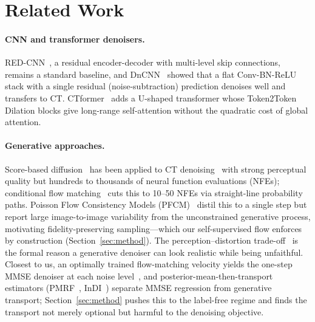 \documentclass[letterpaper]{article} %
\begin{document}
\section{Related Work}

\paragraph{CNN and transformer denoisers.}
RED-CNN~\cite{chen2017lowdose}, a residual encoder-decoder with multi-level skip
connections, remains a standard baseline, and DnCNN~\cite{zhang2017beyond} showed
that a flat Conv-BN-ReLU stack with a single residual (noise-subtraction)
prediction denoises well and transfers to CT.  CTformer~\cite{wang2022ctformer}
adds a U-shaped transformer whose Token2Token Dilation blocks give long-range
self-attention without the quadratic cost of global attention.

\paragraph{Generative approaches.}
Score-based diffusion~\cite{song2021scorebased} has been applied to CT
denoising~\cite{gao2023corediff} with strong perceptual quality but hundreds to
thousands of neural function evaluations (NFEs); conditional flow
matching~\cite{lipman2022flow,albergo2022building} cuts this to 10--50 NFEs via
straight-line probability paths.  Poisson Flow Consistency Models
(PFCM)~\cite{hein2025pfcm} distil this to a single step but report large
image-to-image variability from the unconstrained generative process, motivating
fidelity-preserving sampling---which our self-supervised flow enforces by
construction (Section~\ref{sec:method}).  The perception--distortion
trade-off~\cite{blau2018perception} is the formal reason a generative denoiser can
look realistic while being unfaithful.  Closest to us, an optimally trained
flow-matching velocity yields the one-step MMSE denoiser at each noise
level~\cite{gagneux2025phases,albergo2023stochastic}, and
posterior-mean-then-transport estimators (PMRF~\cite{ohayon2025pmrf},
InDI~\cite{delbracio2023indi}) separate MMSE regression from generative transport;
Section~\ref{sec:method} pushes this to the label-free regime and finds the
transport not merely optional but harmful to the denoising objective.
\end{document}
